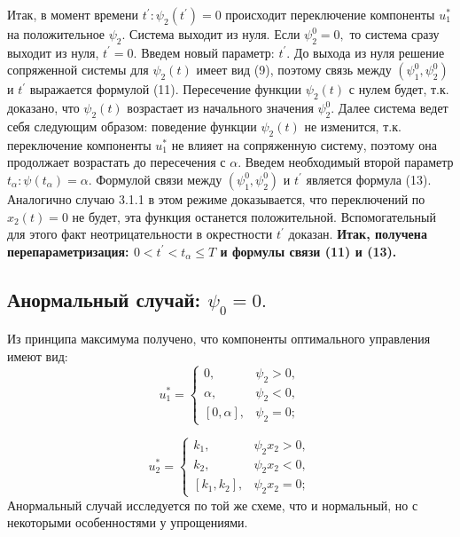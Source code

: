 \documentclass[11pt]{article}
\begin{document}
{{\newline
Итак, в момент времени $t^{'}:\psi_2(t^{'}) = 0$ происходит переключение компоненты $u_1^*$ на положительное $\psi_2.$ Система выходит из нуля. Если $\psi_2^0 = 0,$ то система сразу выходит из нуля, $t^{'} = 0.$
\newline
Введем новый параметр: $t^{'}$. До выхода из нуля решение сопряженной системы для $\psi_2(t)$ имеет вид (9), поэтому связь между $(\psi_1^0,\psi_2^0)$ и $t^{'}$ выражается формулой (11). Пересечение функции $\psi_2(t)$ с нулем будет, т.к. доказано, что $\psi_2(t)$ возрастает из начального значения $\psi_2^0$.
\newline
Далее система ведет себя следующим образом: поведение функции $\psi_2(t)$ не изменится, т.к. переключение компоненты $u_1^*$ не влияет на сопряженную систему, поэтому она продолжает возрастать до пересечения с $\alpha$. Введем необходимый второй параметр $t_\alpha:\psi(t_\alpha) = \alpha.$ Формулой связи между $(\psi_1^0,\psi_2^0)$ и $t^{'}$ является формула (13).
\newline
Аналогично случаю 3.1.1 в этом режиме доказывается, что переключений по $x_2(t) = 0$ не будет, эта функция останется положительной. Вспомогательный для этого факт неотрицательности в окрестности $t^{'}$ доказан.
\newline
\textbf{Итак, получена перепараметризация: $0 < t^{'} < t_\alpha \leq T$ и формулы связи (11) и (13).}
}
\subsection{Анормальный случай: $\psi_0 = 0.$}
{Из принципа максимума получено, что компоненты оптимального управления имеют вид:
\begin{equation}
u_1^* = \begin{cases}
0, & \psi_2 > 0,\\
\alpha, & \psi_2 < 0,\\
[0,\alpha], & \psi_2 = 0;
\end{cases}
\end{equation}

\begin{equation}
u_2^* = \begin{cases}
k_1, & \psi_2x_2 > 0,\\
k_2, & \psi_2x_2 < 0,\\
[k_1,k_2], & \psi_2x_2 = 0;
\end{cases}
\end{equation}
Анормальный случай исследуется по той же схеме, что и нормальный, но с некоторыми особенностями у упрощениями.
}}
\end{document}
